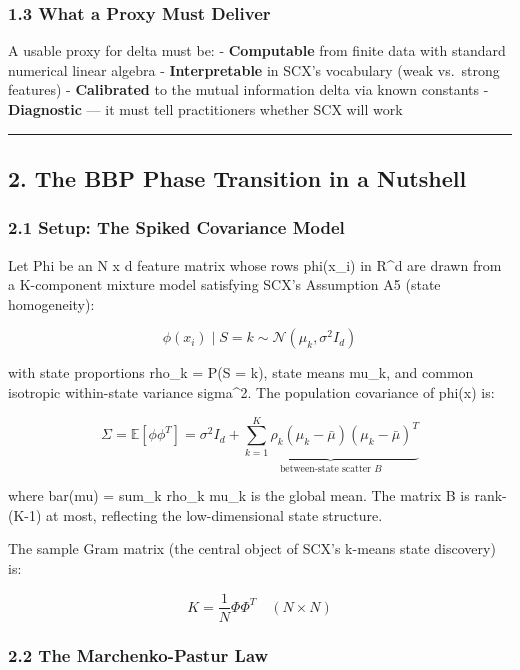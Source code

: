 \documentclass[
  12pt,
]{article}
\begin{document}
\subsubsection{1.3 What a Proxy Must
Deliver}\label{what-a-proxy-must-deliver}

A usable proxy for delta must be: - \textbf{Computable} from finite data
with standard numerical linear algebra - \textbf{Interpretable} in SCX's
vocabulary (weak vs.~strong features) - \textbf{Calibrated} to the
mutual information delta via known constants - \textbf{Diagnostic} ---
it must tell practitioners whether SCX will work

\begin{center}\rule{0.5\linewidth}{0.5pt}\end{center}

\subsection{2. The BBP Phase Transition in a
Nutshell}\label{the-bbp-phase-transition-in-a-nutshell}

\subsubsection{2.1 Setup: The Spiked Covariance
Model}\label{setup-the-spiked-covariance-model}

Let Phi be an N x d feature matrix whose rows phi(x\_i) in R\^{}d are
drawn from a K-component mixture model satisfying SCX's Assumption A5
(state homogeneity):

\[\phi(x_i) \mid S = k \sim \mathcal{N}(\mu_k, \sigma^2 I_d)\]

with state proportions rho\_k = P(S = k), state means mu\_k, and common
isotropic within-state variance sigma\^{}2. The population covariance of
phi(x) is:

\[\Sigma = \mathbb{E}[\phi\phi^T] = \sigma^2 I_d + \underbrace{\sum_{k=1}^K \rho_k (\mu_k - \bar{\mu})(\mu_k - \bar{\mu})^T}_{\text{between-state scatter } B}\]

where bar(mu) = sum\_k rho\_k mu\_k is the global mean. The matrix B is
rank-(K-1) at most, reflecting the low-dimensional state structure.

The sample Gram matrix (the central object of SCX's k-means state
discovery) is:

\[K = \frac{1}{N} \Phi \Phi^T \quad (N \times N)\]

\subsubsection{2.2 The Marchenko-Pastur
Law}\label{the-marchenko-pastur-law}
\end{document}
